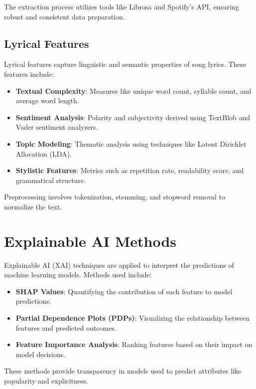 The extraction process utilizes tools like Librosa and Spotify's API, ensuring robust and consistent data preparation.

\subsection{Lyrical Features}
\label{sec:lyricalfeatures}

Lyrical features capture linguistic and semantic properties of song lyrics. These features include:

\begin{itemize}
  \item \textbf{Textual Complexity}: Measures like unique word count, syllable count, and average word length.
  \item \textbf{Sentiment Analysis}: Polarity and subjectivity derived using TextBlob and Vader sentiment analyzers.
  \item \textbf{Topic Modeling}: Thematic analysis using techniques like Latent Dirichlet Allocation (LDA).
  \item \textbf{Stylistic Features}: Metrics such as repetition rate, readability score, and grammatical structure.
\end{itemize}

Preprocessing involves tokenization, stemming, and stopword removal to normalize the text.


\section{Explainable AI Methods}
\label{sec:explainableaimethods}

Explainable AI (XAI) techniques are applied to interpret the predictions of machine learning models. Methods used include:

\begin{itemize}
  \item \textbf{SHAP Values}: Quantifying the contribution of each feature to model predictions.
  \item \textbf{Partial Dependence Plots (PDPs)}: Visualizing the relationship between features and predicted outcomes.
  \item \textbf{Feature Importance Analysis}: Ranking features based on their impact on model decisions.
\end{itemize}

These methods provide transparency in models used to predict attributes like popularity and explicitness.

